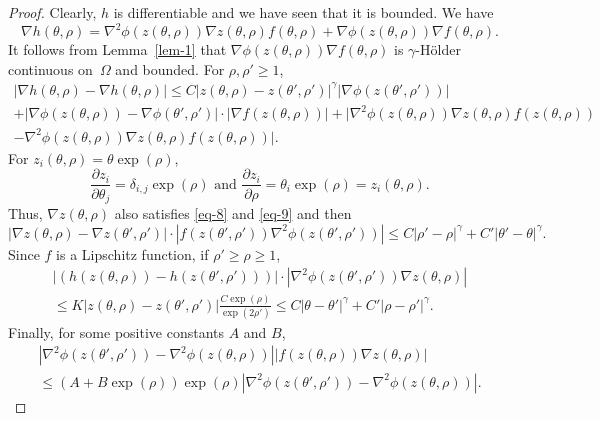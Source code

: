 \documentclass[a4paper,12pt]{article}
\theoremstyle{definition}
\begin{document}
\begin{proof}
Clearly, $h$ is differentiable and we have seen that it is bounded.
We have
\begin{equation*}
\nabla h(\theta,\rho)=\nabla^2\phi(z(\theta,\rho))\nabla z(\theta,\rho)
f(\theta,\rho)+\nabla \phi(z(\theta,\rho))\nabla f(\theta,\rho).
\end{equation*}
It follows from Lemma~\ref{lem-1} that 
$\nabla \phi(z(\theta,\rho))\nabla f(\theta,\rho)$ is 
$\gamma$-Hölder continuous on~$\Omega$ and bounded.
For $\rho,\rho'\geq 1$, 
\begin{multline*}
|\nabla h(\theta,\rho)-\nabla h(\theta,\rho)|
\leq C|z(\theta,\rho)-z(\theta',\rho')|^{\gamma}|\nabla \phi(z(\theta',\rho'))|\\
+|\nabla \phi(z(\theta,\rho))-\nabla \phi(\theta',\rho')|\cdot
|\nabla f(z(\theta,\rho))|
+|\nabla^2\phi(z(\theta,\rho))\nabla z(\theta,\rho)f(z(\theta,\rho))\\
-\nabla^2\phi(z(\theta,\rho))\nabla z(\theta,\rho)f(z(\theta,\rho))|.
\end{multline*}
For $z_i(\theta,\rho)=\theta\exp(\rho)$,
\begin{equation*}
\frac{\partial z_i}{\partial \theta_j}=\delta_{i,j}\exp(\rho)
\text{ and }\frac{\partial z_i}{\partial \rho}=\theta_i\exp(\rho)=z_i(\theta,\rho).
\end{equation*}
Thus, $\nabla z(\theta,\rho)$ also satisfies \eqref{eq-8} and \eqref{eq-9}
and then
\begin{equation*}
|\nabla z(\theta,\rho)-\nabla z(\theta',\rho')|
\cdot |f(z(\theta',\rho'))\nabla^2\phi(z(\theta',\rho'))|
\leq C|\rho'-\rho|^{\gamma}
+C'|\theta'-\theta|^{\gamma}.
\end{equation*}
Since $f$ is a Lipschitz function, if $\rho'\geq \rho\geq 1$,
\begin{multline*}
|(h(z(\theta,\rho))
-h(z(\theta',\rho')))|\cdot
|\nabla^2\phi(z(\theta',\rho'))\nabla z(\theta,\rho)|\\
\leq K|z(\theta,\rho)-z(\theta',\rho')|\frac{C\exp(\rho)}{\exp(2\rho')}
\leq C|\theta-\theta'|^{\gamma}+C'|\rho-\rho'|^{\gamma}.
\end{multline*}
Finally, for some positive constants $A$ and $B$, 
\begin{multline}
\label{eq-13}
|\nabla^2\phi(z(\theta',\rho'))-\nabla^2\phi(z(\theta,\rho))|
|f(z(\theta,\rho))\nabla z(\theta,\rho)|\\
\leq (A+B\exp(\rho))\exp(\rho)|\nabla^2\phi(z(\theta',\rho'))-\nabla^2\phi(z(\theta,\rho))|.
\end{multline}

\end{proof}
\end{document}
